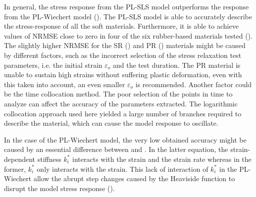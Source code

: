 In general, the stress response from the PL-SLS model outperforms the response from the PL-Wiechert model (). The PL-SLS model is able to accurately describe the stress-response of all the soft materials. Furthermore, it is able to achieve values of NRMSE close to zero in four of the six rubber-based materials tested (). The slightly higher NRMSE for the SR () and PR () materials might be caused by different factors, such as the incorrect selection of the stress relaxation test parameters, i.e. the initial strain $\varepsilon_o$ and the test duration. The PR material is unable to sustain high strains without suffering plastic deformation, even with this taken into account, an even smaller $\varepsilon_o$ is recommended. Another factor could be the time collocation method. The poor selection of the points in time to analyze can affect the accuracy of the parameters extracted. The logarithmic collocation approach used here yielded a large number of branches required to describe the material, which can cause the model response to oscillate.

In the case of the PL-Wiechert model, the very low obtained accuracy might be caused by an essential difference between  and . In the latter equation, the strain-dependent stiffness $k_i^*$ interacts with the strain and the strain rate whereas in the former, $k_i^*$ only interacts with the strain. This lack of interaction of $k_i^*$ in the PL-Wiechert allow the abrupt step changes caused by the Heaviside function to disrupt the model stress response ().

